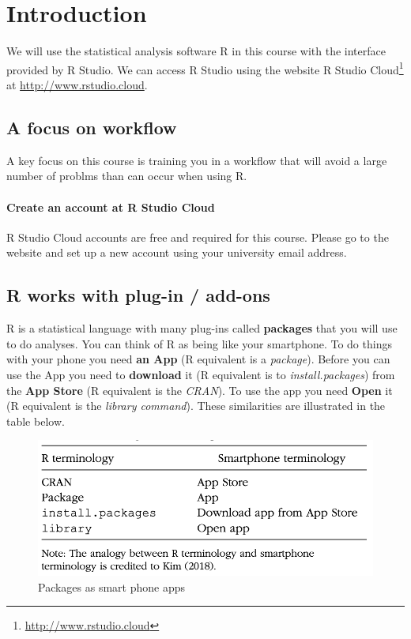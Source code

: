 \documentclass[
]{krantz}
\renewcommand{\href}[2]{#2\footnote{\url{#1}}}
\begin{document}
\mainmatter

\hypertarget{introduction}{%
\chapter{Introduction}\label{introduction}}

We will use the statistical analysis software R in this course with the interface provided by R Studio. We can access R Studio using the website \href{http://www.rstudio.cloud}{R Studio Cloud} at \url{http://www.rstudio.cloud}.

\hypertarget{a-focus-on-workflow}{%
\section{A focus on workflow}\label{a-focus-on-workflow}}

A key focus on this course is training you in a workflow that will avoid a large number of problms than can occur when using R.

\hypertarget{create-an-account-at-r-studio-cloud}{%
\subsubsection{Create an account at R Studio Cloud}\label{create-an-account-at-r-studio-cloud}}

R Studio Cloud accounts are free and required for this course. Please go to the website and set up a new account using your university email address.

\hypertarget{r-works-with-plug-in-add-ons}{%
\section{R works with plug-in / add-ons}\label{r-works-with-plug-in-add-ons}}

R is a statistical language with many plug-ins called \textbf{packages} that you will use to do analyses. You can think of R as being like your smartphone. To do things with your phone you need \textbf{an App} (R equivalent is a \emph{package}). Before you can use the App you need to \textbf{download} it (R equivalent is to \emph{install.packages}) from the \textbf{App Store} (R equivalent is the \emph{CRAN}). To use the app you need \textbf{Open} it (R equivalent is the \emph{library command}). These similarities are illustrated in the table below.

\begin{figure}
\includegraphics[width=0.5\linewidth]{first_time/images/smartphone_analogy} \caption{Packages as smart phone apps}\label{fig:unnamed-chunk-3}
\end{figure}
\end{document}

